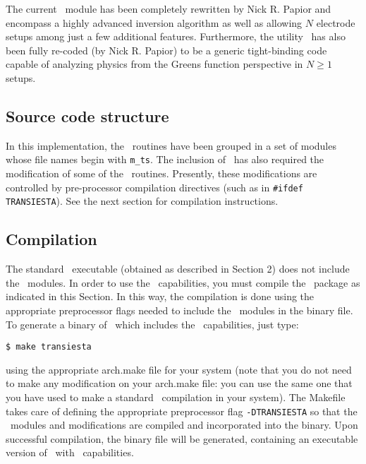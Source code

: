The current \tsiesta\ module has been completely rewritten by Nick
R. Papior and encompass a highly advanced inversion algorithm as well
as allowing $N$ electrode setups among just a few additional
features. Furthermore, the utility \tbtrans\ has also been fully
re-coded (by Nick R. Papior) to be a generic tight-binding code capable
of analyzing physics from the Greens function perspective in $N\ge1$
setups.

\subsection{Source code structure}

In this implementation, the \tsiesta\ routines have been grouped in a
set of modules whose file names begin with \texttt{m\_ts}. The
inclusion of \tsiesta\ has also required the modification of some of
the \siesta\ routines. Presently, these modifications are controlled
by pre-processor compilation directives (such as in \texttt{\#ifdef
    TRANSIESTA}). See the next section for compilation instructions.

\subsection{Compilation}

The standard \siesta\ executable (obtained as described in Section
2) does not include the \tsiesta\ modules. In order to use the
\tsiesta\ capabilities, you must compile the \siesta\
package as indicated in this Section. In this way, the compilation is
done using the appropriate preprocessor flags needed to include the
\tsiesta\ modules in the binary file. To generate a binary of
\siesta\ which includes the \tsiesta\ capabilities, just
type:

\begin{verbatim}
$ make transiesta
\end{verbatim}

using the appropriate arch.make file for your system (note that you do
not need to make any modification on your arch.make file: you can use
the same one that you have used to make a standard \siesta\
compilation in your system).  The Makefile takes care of defining the
appropriate preprocessor flag \texttt{-DTRANSIESTA} so that the \tsiesta\ 
modules and modifications are compiled and incorporated
into the binary. Upon successful compilation, the binary file 
\program{transiesta} will be generated, containing an executable version of
\siesta\ with \tsiesta\ capabilities.

